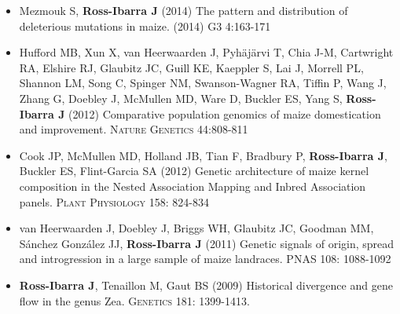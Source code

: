 \documentclass[10pt]{article}
\begin{document}
\begin{itemize} \setlength{\itemsep}{0pt} \setlength{\parskip}{2pt} \setlength{\parsep}{0pt}




\item Mezmouk S, {\bf Ross-Ibarra J} (2014) The pattern and distribution of deleterious mutations in maize. (2014) \textsc{G3} 4:163-171

\item Hufford MB, Xun X, van Heerwaarden J, Pyh\"aj\"arvi T, Chia J-M, Cartwright RA, Elshire RJ, Glaubitz JC, Guill KE, Kaeppler S, Lai J, Morrell PL, Shannon LM, Song C, Spinger NM, Swanson-Wagner RA, Tiffin P, Wang J, Zhang G, Doebley J, McMullen MD, Ware D, Buckler ES, Yang S, {\bf Ross-Ibarra J} (2012) Comparative population genomics of maize domestication and improvement. \textsc{Nature Genetics} 44:808-811

\item Cook JP, McMullen MD, Holland JB, Tian F, Bradbury P, {\bf Ross-Ibarra J}, Buckler ES, Flint-Garcia SA (2012) Genetic architecture of maize kernel composition in the Nested Association Mapping and Inbred Association panels.  \textsc{Plant Physiology} 158: 824-834

\item {van Heerwaarden J}, Doebley J, Briggs WH, Glaubitz JC, Goodman MM, S\'{a}nchez Gonz\'{a}lez JJ, {\bf Ross-Ibarra J} (2011) Genetic signals of origin, spread and introgression in a large sample of maize landraces. PNAS 108: 1088-1092

\item {\bf Ross-Ibarra J}, Tenaillon M, Gaut BS (2009) Historical divergence and gene flow in the genus Zea.  \textsc{Genetics} 181: 1399-1413.


\end{itemize}
\end{document}
